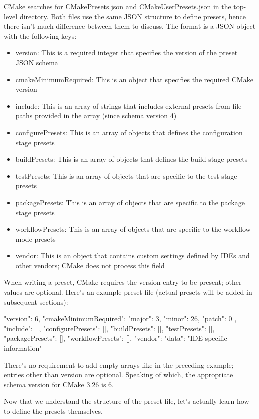 CMake searches for CMakePresets.json and CMakeUserPresets.json in the top-level directory. Both files use the same JSON structure to define presets, hence there isn’t much difference between them to discuss. The format is a JSON object with the following keys:

\begin{itemize}
\item
version: This is a required integer that specifies the version of the preset JSON schema

\item
cmakeMinimumRequired: This is an object that specifies the required CMake version

\item
include: This is an array of strings that includes external presets from file paths provided in the array (since schema version 4)

\item
configurePresets: This is an array of objects that defines the configuration stage presets

\item
buildPresets: This is an array of objects that defines the build stage presets

\item
testPresets: This is an array of objects that are specific to the test stage presets

\item
packagePresets: This is an array of objects that are specific to the package stage presets

\item
workflowPresets: This is an array of objects that are specific to the workflow mode presets

\item
vendor: This is an object that contains custom settings defined by IDEs and other vendors; CMake does not process this field
\end{itemize}

When writing a preset, CMake requires the version entry to be present; other values are optional. Here’s an example preset file (actual presets will be added in subsequent sections):


\begin{json}
{
    "version": 6,
    "cmakeMinimumRequired": {
        "major": 3,
        "minor": 26,
        "patch": 0
    },
    "include": [],
    "configurePresets": [],
    "buildPresets": [],
    "testPresets": [],
    "packagePresets": [],
    "workflowPresets": [],
    "vendor": {
        "data": "IDE-specific information"
    }
}
\end{json}

There’s no requirement to add empty arrays like in the preceding example; entries other than version are optional. Speaking of which, the appropriate schema version for CMake 3.26 is 6.

Now that we understand the structure of the preset file, let’s actually learn how to define the presets themselves.

